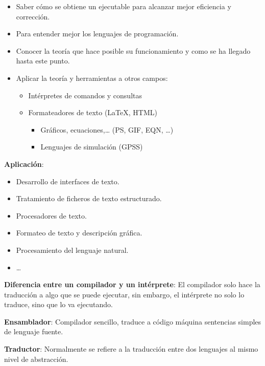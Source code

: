 \documentclass[12pt, twoside, openright]{report} %
\begin{document}
\begin{itemize}

\item
  Saber cómo se obtiene un ejecutable para alcanzar mejor eficiencia y
  corrección.
\item
  Para entender mejor los lenguajes de programación.
\item
  Conocer la teoría que hace posible su funcionamiento y como se ha
  llegado hasta este punto.
\item
  Aplicar la teoría y herramientas a otros campos:

  \begin{itemize}
  
  \item
    Intérpretes de comandos y consultas
  \item
    Formateadores de texto (LaTeX, HTML)

    \begin{itemize}
    
    \item
      Gráficos, ecuaciones,\ldots{} (PS, GIF, EQN, \ldots)
    \item
      Lenguajes de simulación (GPSS)
    \end{itemize}
  \end{itemize}
\end{itemize}
\pagebreak
\textbf{Aplicación}:

\begin{itemize}

\item
  Desarrollo de interfaces de texto.
\item
  Tratamiento de ficheros de texto estructurado.
\item
  Procesadores de texto.
\item
  Formateo de texto y descripción gráfica.
\item
  Procesamiento del lenguaje natural.
\item
  \ldots{}
\end{itemize}

\textbf{Diferencia entre un compilador y un intérprete}: El compilador solo
hace la traducción a algo que se puede ejecutar, sin embargo, el
intérprete no solo lo traduce, sino que lo va ejecutando.

\textbf{Ensamblador}: Compilador sencillo, traduce a código máquina
sentencias simples de lenguaje fuente.

\textbf{Traductor}: Normalmente se refiere a la traducción entre dos
lenguajes al mismo nivel de abstracción.
\end{document}
